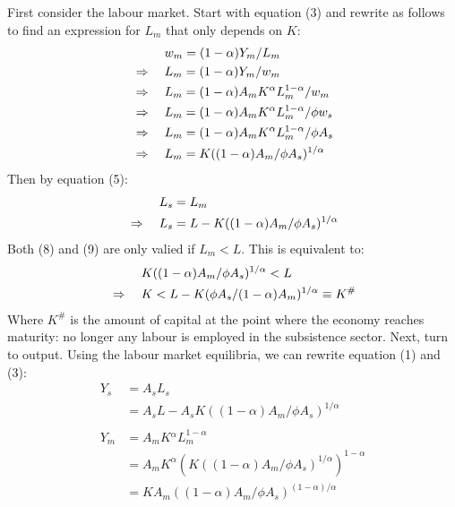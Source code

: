 \documentclass[a4paper]{article}
\begin{document}
First consider the labour market. Start with equation (3) and rewrite as follows to find an expression for $L_m$ that only depends on $K$:
\begin{alignat}{2}
	&			  && \hspace{0.1cm} w_m=(1-{\alpha})Y_m/L_m \nonumber\\
	& \Rightarrow && \hspace{0.1cm} L_m=(1-{\alpha})Y_m/w_m \nonumber\\
    & \Rightarrow && \hspace{0.1cm} L_m=(1-{\alpha})A_mK^{\alpha}L_m^{1-{\alpha}}/w_m \nonumber\\
    & \Rightarrow && \hspace{0.1cm} L_m=(1-{\alpha})A_mK^{\alpha}L_m^{1-{\alpha}}/{\phi}w_s \nonumber\\
    & \Rightarrow && \hspace{0.1cm} L_m=(1-{\alpha})A_mK^{\alpha}L_m^{1-{\alpha}}/{\phi}A_s \nonumber\\
    & \Rightarrow && \hspace{0.1cm} L_m=K((1-{\alpha})A_m/{\phi}A_s)^{1/{\alpha}}
\end{alignat}
Then by equation (5):
\begin{alignat}{2}
	& 	&& \hspace{0.1cm} L_s=L_m \nonumber\\
	& \Rightarrow && \hspace{0.1cm} L_s=L-K((1-{\alpha})A_m/{\phi}A_s)^{1/{\alpha}}
\end{alignat}
Both (8) and (9) are only valied if $L_m<L$. This is equivalent to:
\begin{alignat}{2}
	& && \hspace{0.1cm} K((1-{\alpha})A_m/{\phi}A_s)^{1/{\alpha}}<L \nonumber\\
	& \Rightarrow && \hspace{0.1cm} K<L-K({\phi}A_s/(1-{\alpha})A_m)^{1/{\alpha}}\hspace{0.1cm}{\equiv}\hspace{0.1cm}K^{\#}
\end{alignat}
\newpage \noindent
Where $K^{\#}$ is the amount of capital at the point where the economy reaches maturity: no longer any labour is employed in the subsistence sector. Next, turn to output. Using the labour market equilibria, we can rewrite equation (1) and (3):
\begin{align}
 Y_s &= A_sL_s \nonumber\\
 &= A_sL-A_sK((1-{\alpha})A_m/{\phi}A_s)^{1/{\alpha}}\\
 & \nonumber\\
 Y_m &= A_mK{^\alpha}L_m^{1-\alpha} \nonumber\\
 &= A_mK^{\alpha}(K((1-{\alpha})A_m/{\phi}A_s)^{1/\alpha})^{1-\alpha}\nonumber\\
 &= KA_m((1-{\alpha})A_m/{\phi}A_s)^{(1-\alpha)/\alpha}
\end{align}
\end{document}
